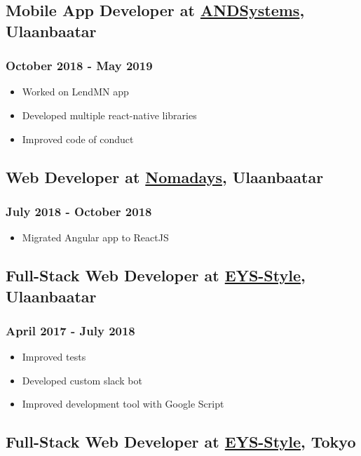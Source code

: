 \documentclass[letterpaper]{article}
\begin{document}
\subsection{Mobile App Developer at \href{https://andsystems.net}{ANDSystems}, Ulaanbaatar}
\label{sec:orgac68030}
\subsubsection{October 2018 - May 2019}
\label{sec:org7b099c3}
\begin{itemize}
\item Worked on LendMN app
\item Developed multiple react-native libraries
\item Improved code of conduct
\end{itemize}
\subsection{Web Developer at \href{https:nomadays.com}{Nomadays}, Ulaanbaatar}
\label{sec:org2650313}
\subsubsection{July 2018 - October 2018}
\label{sec:orgaca71bc}
\begin{itemize}
\item Migrated Angular app to ReactJS
\end{itemize}
\subsection{Full-Stack Web Developer at \href{http:www.eys-style.com}{EYS-Style}, Ulaanbaatar}
\label{sec:orgc842449}
\subsubsection{April 2017 - July 2018}
\label{sec:org5285b8b}
\begin{itemize}
\item Improved tests
\item Developed custom slack bot
\item Improved development tool with Google Script
\end{itemize}
\subsection{Full-Stack Web Developer at \href{http:www.eys-style.com}{EYS-Style}, Tokyo}
\label{sec:orgac04d60}
\end{document}

